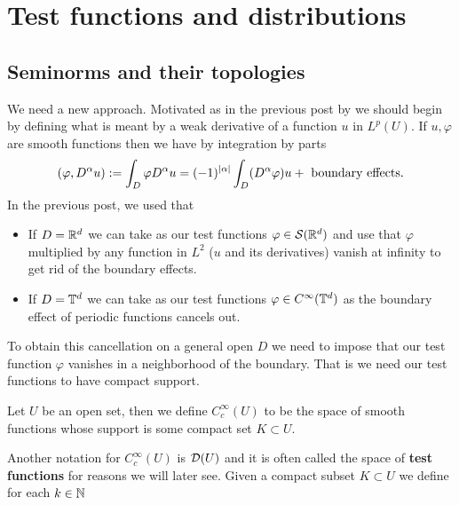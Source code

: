 \documentclass[
    a4paper,
    DIV=14,
    abstract=true,
    numbers=noenddot
]{scrartcl}
\begin{document}
\section{Test functions and distributions}%
\subsection{Seminorms and their topologies}
We need a new approach. Motivated as in the previous post by  we should begin by defining what is meant by a weak derivative of a function $u$ in $L^p(U)$. If $u,\varphi$ are smooth functions then we have by integration by parts
\begin{align*}
	(\varphi, D^\alpha u):= \int_{D} \varphi D^\alpha u  = (-1)^{{\left| \alpha \right|} }\int_{D}(D^{\alpha} \varphi) u + \text{ boundary effects}  .
\end{align*}
In the previous post, we used that
\begin{itemize}
	\item If $D =\mathbb{R}^d$ we can take as our test functions $\varphi \in  \mathcal{S}(\mathbb{R}^d)$ and use that $\varphi$ multiplied by any function in $L^2$ ($u$ and its derivatives) vanish at infinity to get rid of the boundary effects.
	\item If $D =\mathbb{T}^d$ we can take as our test functions $\varphi \in  C^\infty(\mathbb{T}^d)$ as the boundary effect of periodic functions cancels out.
\end{itemize}
To obtain this cancellation on a general open $D$ we need to impose that our test function  $\varphi$ vanishes in a neighborhood of the boundary. That is we need our test functions to have compact support.
\begin{definition}
	Let $U$ be an open set, then we define  $C_c^\infty(U)$ to be the space of smooth functions whose support is some compact set $K \subset U$.     \end{definition}
Another notation for $C^\infty_c(U)$ is $\mathcal{D}(U)$ and it is often called the space of \textbf{test functions} for reasons we will later see.  Given a compact subset $K \subset U$  we define for each $k \in \mathbb{N}$
\end{document}
